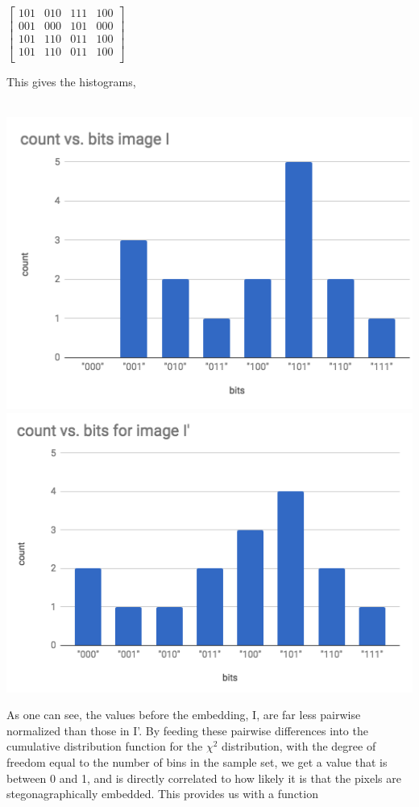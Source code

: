 \documentclass[12pt]{article}
\begin{document}
\begin{center}
 $ \left[ \begin{array}{cccc}
 101 & 010 & 111 & 100\\
  001 & 000 & 101 & 000\\
 101 & 110 & 011 & 100 \\
 101 & 110 & 011 & 100 \\  \end{array} \right] $ 
\end{center} 
\newpage This gives the histograms, \\ \\  
\begin{center}
\includegraphics[scale=.45]{histogramI.png} 
\includegraphics[scale=.45]{histogramIprime.png} 
\end{center}
\par As one can see, the values before the embedding, I, are far less pairwise normalized than those in I'. By feeding these pairwise differences into the cumulative distribution function for the $\chi^2$ distribution, with the degree of freedom equal to the number of bins in the sample set, we get a value that is between 0 and 1, and is directly correlated to how likely it is that the pixels are stegonagraphically embedded. This provides us with a function 
\end{document}
